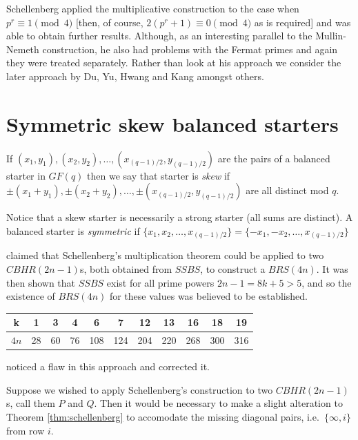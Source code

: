 \documentclass[
  11pt,
  a4paper]{book}
\begin{document}
Schellenberg applied the multiplicative construction to the case when
\(p^r \equiv 1\pmod 4\) {[}then, of course,
\(2(p^r + 1) \equiv 0\pmod 4\) as is required{]} and was able to obtain
further results. Although, as an interesting parallel to the
Mullin-Nemeth construction, he also had problems with the Fermat primes
and again they were treated separately. Rather than look at his approach
we consider the later approach by Du, Yu, Hwang and Kang amongst others.

\hypertarget{symmetric-skew-balanced-starters}{%
\section{Symmetric skew balanced
starters}\label{symmetric-skew-balanced-starters}}

If \((x_1, y_1), (x_2, y_2),\ldots, (x_{(q - 1)/2}, y_{(q - 1)/2})\) are
the pairs of a balanced starter in \(GF(q)\) then we say that starter is
\emph{skew} if
\(\pm(x_1 + y_1), \pm(x_2 + y_2),\ldots, \pm(x_{(q - 1)/2}, y_{(q - 1)/2})\)
are all distinct mod \(q\).

Notice that a skew starter is necessarily a strong starter (all sums are
distinct). A balanced starter is \emph{symmetric} if
\(\{x_1, x_2,\ldots, x_{(q - 1)/2}\} = \{-x_1, -x_2,\ldots, x_{(q - 1)/2}\}\)

\textcite{hwang_complete_1984} claimed that Schellenberg's
multiplication theorem could be applied to two \(CBHR(2n - 1)\)s, both
obtained from \(SSBS\), to construct a \(BRS(4n)\). It was then shown
that \(SSBS\) exist for all prime powers \(2n - 1 = 8k + 5 > 5\), and so
the existence of \(BRS(4n)\) for these values was believed to be
established.

\begin{center}
\begin{tabular}{|c|c|c|c|c|c|c|c|c|c|c|}
\hline
  k  &  1 &  3 &  4 &   6 &   7 &  12 &  13 &  16 &  18 & 19 \\ \hline
$4n$ & 28 & 60 & 76 & 108 & 124 & 204 & 220 & 268 & 300 & 316 \\ \hline
\end{tabular}
\end{center}

\textcite{anderson_construction_1999} noticed a flaw in this approach
and corrected it.

Suppose we wished to apply Schellenberg's construction to two
\(CBHR(2n - 1)\)s, call them \(P\) and \(Q\). Then it would be necessary
to make a slight alteration to Theorem \ref{thm:schellenberg} to
accomodate the missing diagonal pairs, i.e.~\(\{\infty, i\}\) from row
\(i\).
\end{document}

